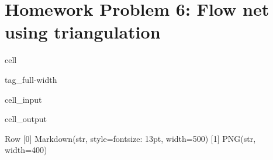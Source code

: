 \documentclass[letterpaper,10pt,english]{jupyterBook}
\begin{document}
\section{Homework Problem 6: Flow net using triangulation}
\label{\detokenize{content/tutorials/T7/tutorial_07:homework-problem-6-flow-net-using-triangulation}}
\begin{sphinxuseclass}{cell}
\begin{sphinxuseclass}{tag_full-width}\begin{sphinxVerbatimInput}

\begin{sphinxuseclass}{cell_input}
\begin{sphinxVerbatim}[commandchars=\\\{\}]
 

     
     

 
\end{sphinxVerbatim}

\end{sphinxuseclass}\end{sphinxVerbatimInput}
\begin{sphinxVerbatimOutput}

\begin{sphinxuseclass}{cell_output}
\begin{sphinxVerbatim}[commandchars=\\\{\}]
Row
    [0] Markdown(str, style=\PYGZob{}\PYGZsq{}font\PYGZhy{}size\PYGZsq{}: \PYGZsq{}13pt\PYGZsq{}\PYGZcb{}, width=500)
    [1] PNG(str, width=400)
\end{sphinxVerbatim}

\end{sphinxuseclass}\end{sphinxVerbatimOutput}

\end{sphinxuseclass}
\end{sphinxuseclass}
\end{document}
